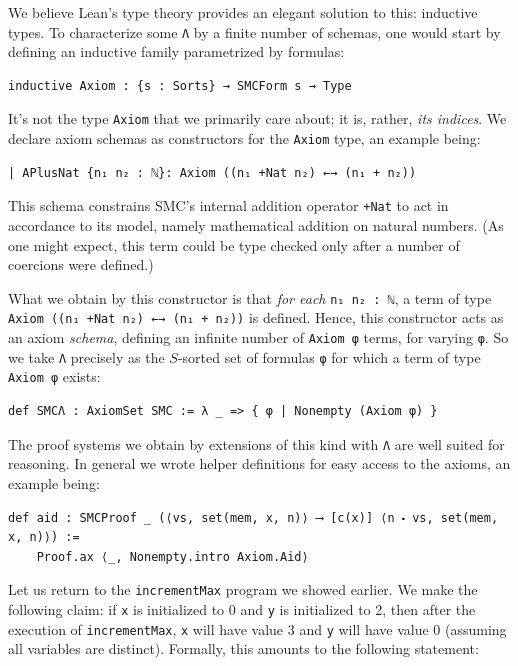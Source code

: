 \documentclass{easychair}
\theoremstyle{remark}
\begin{document}
We believe Lean's type theory provides an elegant solution to this: inductive types. To characterize some \lstinline|Λ| by a finite number of schemas, one would start by defining an inductive family parametrized by formulas:

\begin{lstlisting}
inductive Axiom : {s : Sorts} → SMCForm s → Type
\end{lstlisting}

It's not the type \lstinline|Axiom| that we primarily care about; it is, rather, \textit{its indices}. We declare axiom schemas as constructors for the \lstinline|Axiom| type, an example being:

\begin{lstlisting}
| APlusNat {n₁ n₂ : ℕ}: Axiom ((n₁ +Nat n₂) ←→ (n₁ + n₂))
\end{lstlisting}

This schema constrains SMC's internal addition operator \lstinline|+Nat| to act in accordance to its model, namely mathematical addition on natural numbers. (As one might expect, this term could be type checked only after a number of coercions were defined.)

What we obtain by this constructor is that \textit{for each} \lstinline|n₁ n₂ : ℕ|, a term of type \lstinline|Axiom ((n₁ +Nat n₂) ←→ (n₁ + n₂))| is defined. Hence, this constructor acts as an axiom \textit{schema}, defining an infinite number of \lstinline|Axiom φ| terms, for varying \lstinline|φ|.  So we take \lstinline|Λ| precisely as the $S$-sorted set of formulas \lstinline|φ| for which a term of type \lstinline|Axiom φ| exists:

\begin{lstlisting}
def SMCΛ : AxiomSet SMC := λ _ => { φ | Nonempty (Axiom φ) }
\end{lstlisting}

The proof systems we obtain by extensions of this kind with \lstinline|Λ| are well suited for reasoning. In general we wrote helper definitions for easy access to the axioms, an example being:
\begin{lstlisting}
def aid : SMCProof _ (⟨vs, set(mem, x, n)⟩ ⟶ [c(x)] ⟨n ⬝ vs, set(mem, x, n)⟩) :=
    Proof.ax ⟨_, Nonempty.intro Axiom.Aid⟩
\end{lstlisting}

Let us return to the \lstinline|incrementMax| program we showed earlier. We make the following claim: if \lstinline|x| is initialized to 0 and \lstinline|y| is initialized to 2, then after the execution of \lstinline|incrementMax|, \lstinline|x| will have value 3 and \lstinline|y| will have value 0 (assuming all variables are distinct). Formally, this amounts to the following statement:
\end{document}
